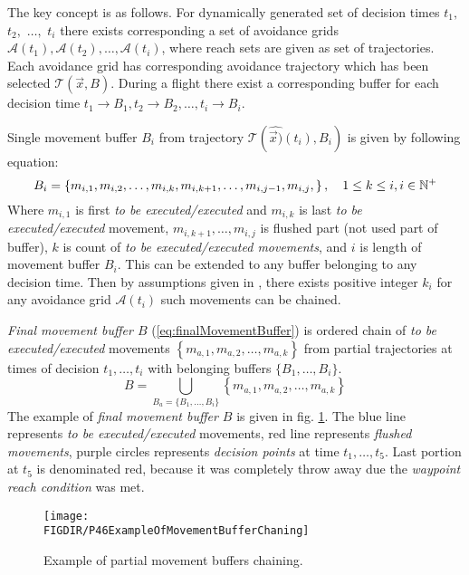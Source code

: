 The key concept is as follows. For dynamically generated set of decision times $t_1,$ $t_2,$ $\dots,$ $t_i$ there exists corresponding a set of avoidance grids $\mathscr{A}(t_1),\mathscr{A}(t_2),\dots,\mathscr{A}(t_i)$, where reach sets are given as set of trajectories. Each avoidance grid has corresponding avoidance trajectory which has been selected $\mathscr{T}(\vec{x},B)$. During a flight there exist a corresponding buffer for each decision time $t_1\to B_1, t_2 \to B_2,\dots,t_i\to B_i$. 

Single movement buffer $B_i$ from trajectory $\mathscr{T}(\hat{\vec{x})}(t_i),B_i)$ is given by following equation:
\begin{equation}
    B_i= \left\{m_{i,1},m_{i,2},\dots,m_{i,k},m_{i,k+1},\dots, m_{i,j-1},m_{i,j},\right\},\quad 1 \le k \le i, i \in \mathbb{N}^+
\end{equation}
Where $m_{i,1}$ is first \emph{to be executed/executed} and $m_{i,k}$ is last \emph{to be executed/executed} movement, $m_{i,k+1},\dots,m_{i,j}$ is flushed part (not used part of buffer), $k$ is count of \emph{to be executed/executed movements}, and $i$ is length of movement buffer $B_i$. This can be extended to any buffer belonging to any decision time. Then by assumptions given in \cite{alojzgomola2017}, there exists positive integer $k_i$ for any avoidance grid $\mathscr{A}(t_i)$ such movements can be chained.

\emph{Final movement buffer $B$} (\ref{eq:finalMovementBuffer}) is ordered chain of \emph{to be executed/executed} movements $\left\{m_{a,1},m_{a,2},\dots,m_{a,k}\right\}$ from partial trajectories at times of decision $t_{1},\dots,t_{i}$ with belonging buffers $\{B_1,\dots,B_i\}$.
\begin{equation}\label{eq:finalMovementBuffer}
    B=\bigcup_{B_a=\{B_1,\dots,B_i\}} \left\{m_{a,1},m_{a,2},\dots,m_{a,k}\right\}
\end{equation}
The example of \emph{final movement buffer $B$} is given in fig. \ref{fig:P46ExampleOfMovementBufferChaning}. The blue line represents \emph{to be executed/executed} movements, red line represents \emph{flushed movements}, purple circles represents \emph{decision points} at time $t_1,\dots,t_5$. Last portion at $t_5$ is denominated red, because it was completely throw away due the \emph{waypoint reach condition} was met.
\begin{figure}[H]
    \centering
    \texttt{[image: \\FIGDIR/P46ExampleOfMovementBufferChaning]}
    \caption{Example of partial movement buffers chaining.}
    \label{fig:P46ExampleOfMovementBufferChaning}
\end{figure}

